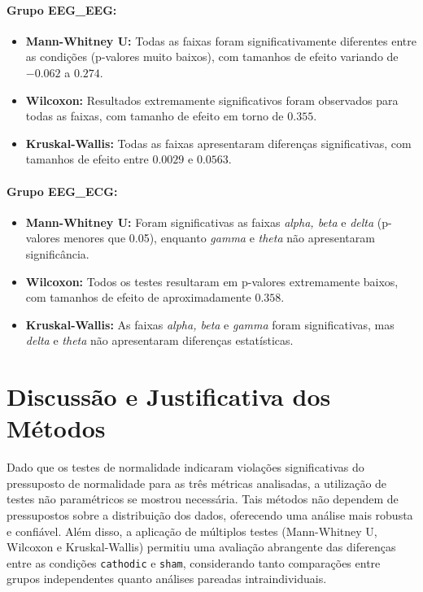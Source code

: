 \paragraph{Grupo EEG\_EEG:}
\begin{itemize}
    \item \textbf{Mann-Whitney U:} Todas as faixas foram significativamente diferentes entre as condições (p-valores muito baixos), com tamanhos de efeito variando de $-0.062$ a $0.274$.
    \item \textbf{Wilcoxon:} Resultados extremamente significativos foram observados para todas as faixas, com tamanho de efeito em torno de $0.355$.
    \item \textbf{Kruskal-Wallis:} Todas as faixas apresentaram diferenças significativas, com tamanhos de efeito entre $0.0029$ e $0.0563$.
\end{itemize}

\paragraph{Grupo EEG\_ECG:}
\begin{itemize}
    \item \textbf{Mann-Whitney U:} Foram significativas as faixas \emph{alpha, beta} e \emph{delta} (p-valores menores que 0.05), enquanto \emph{gamma} e \emph{theta} não apresentaram significância.
    \item \textbf{Wilcoxon:} Todos os testes resultaram em p-valores extremamente baixos, com tamanhos de efeito de aproximadamente $0.358$.
    \item \textbf{Kruskal-Wallis:} As faixas \emph{alpha, beta} e \emph{gamma} foram significativas, mas \emph{delta} e \emph{theta} não apresentaram diferenças estatísticas.
\end{itemize}

\section{Discussão e Justificativa dos Métodos}

Dado que os testes de normalidade indicaram violações significativas do pressuposto de normalidade para as três métricas analisadas, a utilização de testes não paramétricos se mostrou necessária. Tais métodos não dependem de pressupostos sobre a distribuição dos dados, oferecendo uma análise mais robusta e confiável. Além disso, a aplicação de múltiplos testes (Mann-Whitney U, Wilcoxon e Kruskal-Wallis) permitiu uma avaliação abrangente das diferenças entre as condições \texorpdfstring{\texttt{cathodic}}{cathodic} e \texorpdfstring{\texttt{sham}}{sham}, considerando tanto comparações entre grupos independentes quanto análises pareadas intraindividuais.

